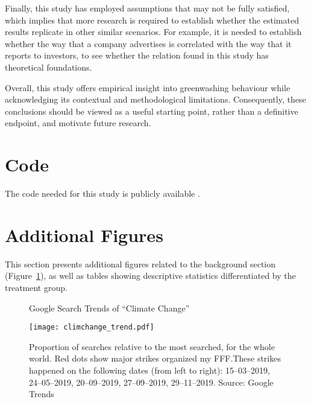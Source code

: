 \documentclass[12pt]{article}
\begin{document}
Finally, this study has employed assumptions that may not be fully satisfied, which implies that more research is required to establish whether the estimated results replicate in other similar scenarios. For example, it is needed to establish whether the way that a company advertises is correlated with the way that it reports to investors, to see whether the relation found in this study has theoretical foundations. 

Overall, this study offers empirical insight into greenwashing behaviour while acknowledging its contextual and methodological limitations. Consequently, these conclusions should be viewed as a useful starting point, rather than a definitive endpoint, and motivate future research.



\pagebreak
\printbibliography{}
\pagebreak
\appendix

\section{Code}

The code needed for this study is publicly available \href{https://github.com/pszewi/thesis}{}.

\renewcommand\thetable{\thesection.\arabic{table}}
\renewcommand\thefigure{\thesection.\arabic{figure}}
\setcounter{table}{0}
\setcounter{figure}{0}

\section{Additional Figures}\label{app:extra_figs}


This section presents additional figures related to the background section (Figure~\ref{fig:cc_trend}), as well as tables showing descriptive statistics differentiated by the treatment group.

\small
\centering

\begin{figure}[ht]

    \caption{Google Search Trends of ``Climate Change''}\label{fig:cc_trend}
    \texttt{[image: climchange\_trend.pdf]}
    \captionsetup{font=footnotesize}
    \caption*{Proportion of searches relative to the most searched, for the whole world. Red dots show major strikes organized my FFF.\@ These strikes happened on the following dates (from left to right): 15--03--2019, 24--05--2019, 20--09--2019, 27--09--2019, 29--11--2019. Source: Google Trends}
\end{figure}
\end{document}
